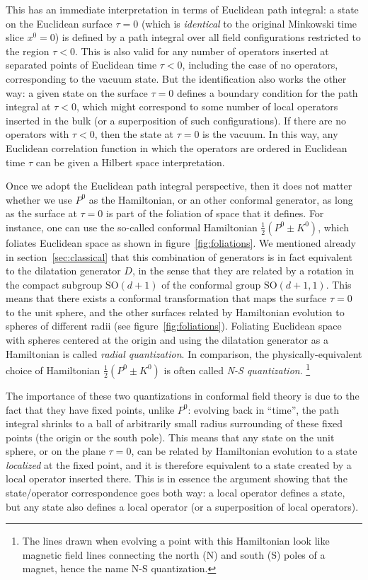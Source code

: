 \documentclass[a4paper,12pt]{article}
\newcommand{\SO}{\text{SO}}
\numberwithin{equation}{section}
\begin{document}
This has an immediate interpretation in terms of Euclidean path integral: 
a state on the Euclidean surface $\tau = 0$ (which is \emph{identical} to the original Minkowski time slice $x^0 = 0$) is defined by a path integral over all field configurations restricted to the region $\tau < 0$. This is also valid for any number of operators inserted at separated points of Euclidean time $\tau < 0$, including the case of no operators, corresponding to the vacuum state. But the identification also works the other way: a given state on the surface $\tau = 0$ defines a boundary condition for the path integral at $\tau < 0$, which might correspond to some number of local operators inserted in the bulk (or a superposition of such configurations). If there are no operators with $\tau < 0$, then the state at $\tau = 0$ is the vacuum.
In this way, any Euclidean correlation function in which the operators are ordered in Euclidean time $\tau$ can be given a Hilbert space interpretation.

Once we adopt the Euclidean path integral perspective, then it does not matter whether we use $P^0$ as the Hamiltonian, or an other conformal generator, as long as the surface at $\tau = 0$ is part of the foliation of space that it defines. For instance, one can use the so-called conformal Hamiltonian $\frac{1}{2} (P^0 \pm K^0)$, which foliates Euclidean space as shown in figure~\ref{fig:foliations}.
We mentioned already in section~\ref{sec:classical} that this combination of generators is in fact equivalent to the dilatation generator $D$, in the sense that they are related by a rotation in the compact subgroup $\SO(d + 1)$ of the conformal group $\SO(d+1, 1)$.
This means that there exists a conformal transformation that maps the surface $\tau = 0$ to the unit sphere, and the other surfaces related by Hamiltonian evolution to spheres of different radii (see figure~\ref{fig:foliations}).
Foliating Euclidean space with spheres centered at the origin and using the dilatation generator as a Hamiltonian is called \emph{radial quantization}. In comparison, the physically-equivalent choice of Hamiltonian  $\frac{1}{2} (P^0 \pm K^0)$ is often called \emph{N-S quantization}.%
%
\footnote{The lines drawn when evolving a point with this Hamiltonian look like magnetic field lines connecting the north (N) and south (S) poles of a magnet, hence the name N-S quantization.}

The importance of these two quantizations in conformal field theory is due to the fact that they have fixed points, unlike $P^0$: evolving back in ``time'', the path integral shrinks to a ball of arbitrarily small radius surrounding of these fixed points (the origin or the south pole). This means that any state on the unit sphere, or on the plane $\tau = 0$, can be related by Hamiltonian evolution to a state \emph{localized} at the fixed point, and it is therefore equivalent to a state created by a local operator inserted there.
This is in essence the argument showing that the state/operator correspondence goes both way: a local operator defines a state, but any state also defines a local operator (or a superposition of local operators).
\end{document}
